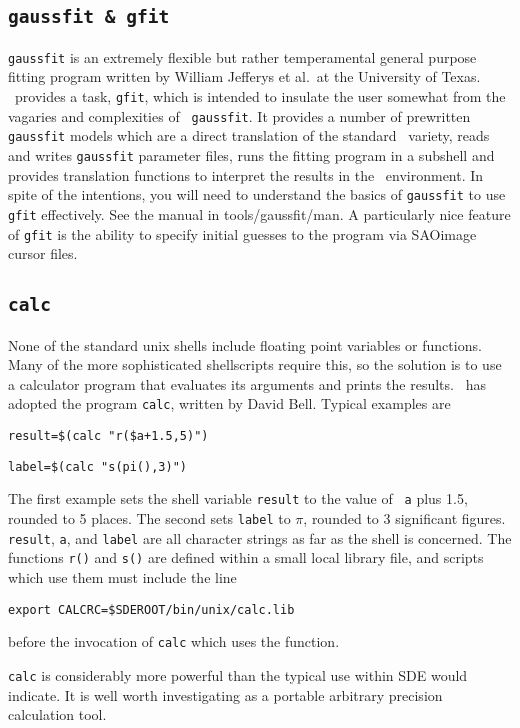 \subsection{\tt gaussfit \& gfit}

{\tt gaussfit} is an extremely flexible but rather temperamental general
purpose fitting program written by William Jefferys et al.\ at the
University of Texas.  \sde\ provides a task, {\tt gfit}, which is intended
to insulate the user somewhat from the vagaries and complexities of {\tt
gaussfit}.  It provides a number of prewritten {\tt gaussfit} models which
are a direct translation of the standard \sde\ variety, reads and writes
{\tt gaussfit} parameter files, runs the fitting program in a subshell and
provides translation functions to interpret the results in the \sde\
environment.  In spite of the intentions, you will need to understand the
basics of {\tt gaussfit} to use {\tt gfit} effectively.  See the manual in
tools/gaussfit/man.  A particularly nice feature of {\tt gfit} is the
ability to specify initial guesses to the program via SAOimage cursor
files.

\subsection{\tt calc}

None of the standard unix shells include floating point variables or
functions.  Many of the more sophisticated shellscripts require this,
so the solution is to use a calculator program that evaluates its
arguments and prints the results.  \sde\ has adopted the program {\tt calc},
written by David Bell.  Typical examples are

\smallskip
{\tt result=\$(calc "r(\$a+1.5,5)")}

\smallskip
{\tt label=\$(calc "s(pi(),3)")}

\smallskip\noindent
The first example sets the shell variable {\tt result} to the value of {\tt
a} plus 1.5, rounded to 5 places.  The second sets {\tt label} to $\pi$,
rounded to 3 significant figures.  {\tt result}, {\tt a}, and {\tt label}
are all character strings as far as the shell is concerned.  The functions
{\tt r()} and {\tt s()} are defined within a small local library file,
and scripts which use them must include the line

{\tt export CALCRC=\$SDEROOT/bin/unix/calc.lib}

\noindent
before the invocation of {\tt calc} which uses the function.

\smallskip
{\tt calc} is considerably more powerful than the typical use within SDE
would indicate.  It is well worth investigating as a portable arbitrary
precision calculation tool.

